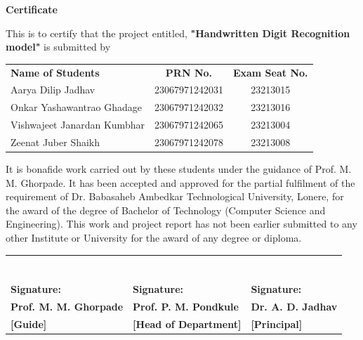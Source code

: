 \documentclass[12pt,a4paper]{report}
\begin{document}
\newpage

\thispagestyle{empty}
\begin{center}
{\Large \bfseries \color{red} Certificate}\\[20pt]
\end{center}

\begin{justify}
{\normalsize
This is to certify that the project entitled,
\textbf{"Handwritten Digit Recognition model"} is submitted by
}
\end{justify}

\begin{center}
\begin{tabular}{l c c}
\textbf{Name of Students} & \textbf{PRN No.} & \textbf{Exam Seat No.} \\
Aarya Dilip Jadhav         & 23067971242031 & 23213015 \\
Onkar Yashawantrao Ghadage         & 23067971242032 & 23213016 \\
Vishwajeet Janardan Kumbhar         & 23067971242065 & 23213004 \\
Zeenat Juber Shaikh         & 23067971242078 & 23213008 \\
\end{tabular}
\end{center}

\begin{justify}
{\normalsize
It is bonafide work carried out by these students under the guidance of
Prof. M. M. Ghorpade.
It has been accepted and approved for the partial fulfilment of the requirement of
Dr. Babasaheb Ambedkar Technological University, Lonere, for the award of the
degree of Bachelor of Technology (Computer Science and Engineering).
This work and project report has not been earlier submitted to any other Institute
or University for the award of any degree or diploma.
}
\end{justify}

\begin{table}[h!]
\centering
\begin{tabular}{p{5cm} p{6cm} p{7cm}} \\ \\ \\ \\ \\ \\ \\ \\
\textbf{Signature:} & \textbf{Signature:} & \textbf{Signature:} \\
\textbf{Prof. M. M. Ghorpade}      & \textbf{Prof. P. M. Pondkule}      & \textbf{Dr. A. D. Jadhav}      \\
\textbf{[Guide]}    & \textbf{[Head of Department]} & \textbf{[Principal]} \\
\end{tabular}
\end{table}
\end{document}
